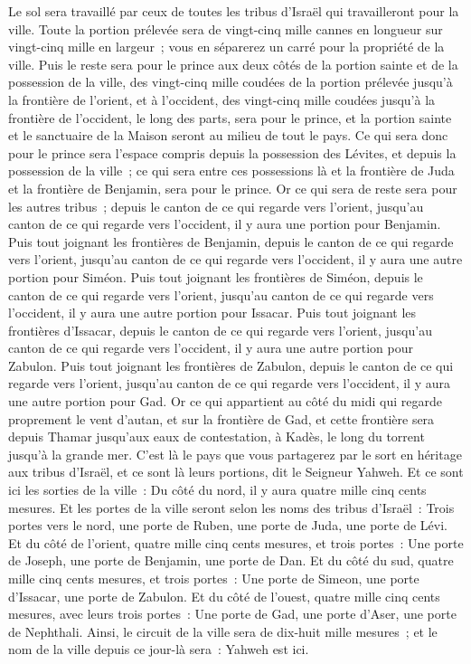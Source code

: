 \begin{multicols}{2}
Le sol sera travaillé par ceux de toutes les tribus d'Israël qui travailleront pour la ville.
Toute la portion prélevée sera de vingt-cinq mille cannes en longueur sur vingt-cinq mille en largeur~; vous en séparerez un carré pour la propriété de la ville.
Puis le reste sera pour le prince aux deux côtés de la portion sainte et de la possession de la ville, des vingt-cinq mille coudées de la portion prélevée jusqu'à la frontière de l'orient, et à l'occident, des vingt-cinq mille coudées jusqu'à la frontière de l'occident, le long des parts, sera pour le prince, et la portion sainte et le sanctuaire de la Maison seront au milieu de tout le pays. 
Ce qui sera donc pour le prince sera l'espace compris depuis la possession des Lévites, et depuis la possession de la ville~; ce qui sera entre ces possessions là et la frontière de Juda et la frontière de Benjamin, sera pour le prince.
Or ce qui sera de reste sera pour les autres tribus~; depuis le canton de ce qui regarde vers l'orient, jusqu'au canton de ce qui regarde vers l'occident, il y aura une portion pour Benjamin.
Puis tout joignant les frontières de Benjamin, depuis le canton de ce qui regarde vers l'orient, jusqu'au canton de ce qui regarde vers l'occident, il y aura une autre portion pour Siméon.
Puis tout joignant les frontières de Siméon, depuis le canton de ce qui regarde vers l'orient, jusqu'au canton de ce qui regarde vers l'occident, il y aura une autre portion pour Issacar.
Puis tout joignant les frontières d'Issacar, depuis le canton de ce qui regarde vers l'orient, jusqu'au canton de ce qui regarde vers l'occident, il y aura une autre portion pour Zabulon.
Puis tout joignant les frontières de Zabulon, depuis le canton de ce qui regarde vers l'orient, jusqu'au canton de ce qui regarde vers l'occident, il y aura une autre portion pour Gad.
Or ce qui appartient au côté du midi qui regarde proprement le vent d'autan, et sur la frontière de Gad, et cette frontière sera depuis Thamar jusqu'aux eaux de contestation, à Kadès, le long du torrent jusqu'à la grande mer.
C'est là le pays que vous partagerez par le sort en héritage aux tribus d'Israël, et ce sont là leurs portions, dit le Seigneur Yahweh.
Et ce sont ici les sorties de la ville~: Du côté du nord, il y aura quatre mille cinq cents mesures.
Et les portes de la ville seront selon les noms des tribus d'Israël~: Trois portes vers le nord, une porte de Ruben, une porte de Juda, une porte de Lévi.
Et du côté de l'orient, quatre mille cinq cents mesures, et trois portes~: Une porte de Joseph, une porte de Benjamin, une porte de Dan.
Et du côté du sud, quatre mille cinq cents mesures, et trois portes~: Une porte de Simeon, une porte d'Issacar, une porte de Zabulon.
Et du côté de l'ouest, quatre mille cinq cents mesures, avec leurs trois portes~: Une porte de Gad, une porte d'Aser, une porte de Nephthali.
Ainsi, le circuit de la ville sera de dix-huit mille mesures~; et le nom de la ville depuis ce jour-là sera~: Yahweh est ici.
\PPE{}
\end{multicols}
